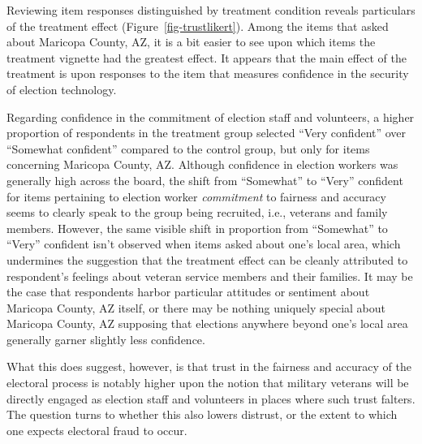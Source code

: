 \documentclass[
  12pt,
  letterpaper,
]{article}
\begin{document}
Reviewing item responses distinguished by treatment condition reveals
particulars of the treatment effect (Figure~\ref{fig-trustlikert}).
Among the items that asked about Maricopa County, AZ, it is a bit easier
to see upon which items the treatment vignette had the greatest effect.
It appears that the main effect of the treatment is upon responses to
the item that measures confidence in the security of election
technology.

Regarding confidence in the commitment of election staff and volunteers,
a higher proportion of respondents in the treatment group selected
``Very confident'' over ``Somewhat confident'' compared to the control
group, but only for items concerning Maricopa County, AZ. Although
confidence in election workers was generally high across the board, the
shift from ``Somewhat'' to ``Very'' confident for items pertaining to
election worker \emph{commitment} to fairness and accuracy seems to
clearly speak to the group being recruited, i.e., veterans and family
members. However, the same visible shift in proportion from ``Somewhat''
to ``Very'' confident isn't observed when items asked about one's local
area, which undermines the suggestion that the treatment effect can be
cleanly attributed to respondent's feelings about veteran service
members and their families. It may be the case that respondents harbor
particular attitudes or sentiment about Maricopa County, AZ itself, or
there may be nothing uniquely special about Maricopa County, AZ
supposing that elections anywhere beyond one's local area generally
garner slightly less confidence.

What this does suggest, however, is that trust in the fairness and
accuracy of the electoral process is notably higher upon the notion that
military veterans will be directly engaged as election staff and
volunteers in places where such trust falters. The question turns to
whether this also lowers distrust, or the extent to which one expects
electoral fraud to occur.
\end{document}

